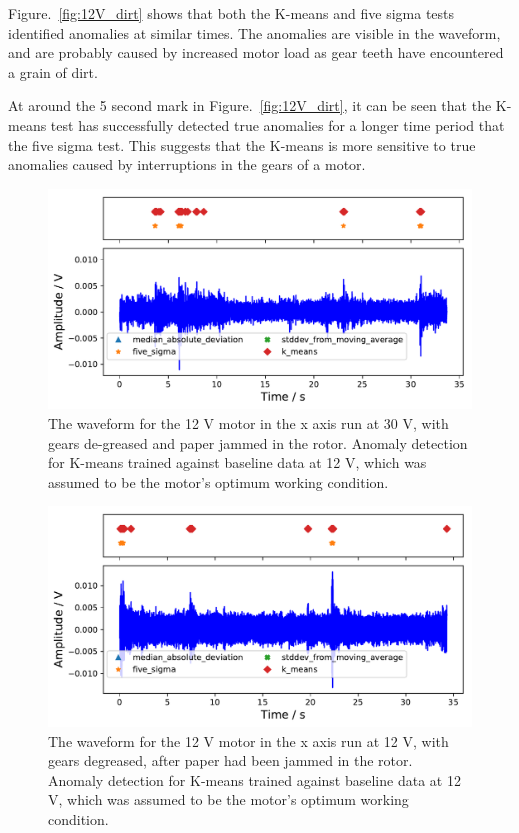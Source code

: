 Figure.~\ref{fig:12V_dirt} shows that both the K-means and five sigma tests identified anomalies at similar times. The anomalies are visible in the waveform, and are probably caused by increased motor load as gear teeth have encountered a grain of dirt. 

At around the 5 second mark in Figure.~\ref{fig:12V_dirt}, it can be seen that the K-means test has successfully detected true anomalies for a longer time period that the five sigma test. This suggests that the K-means is more sensitive to true anomalies caused by interruptions in the gears of a motor.

\begin{figure}[t]
    \includegraphics[width=1.0\textwidth]{fig/WD40_dry_dirt_12V_motornorm12V.pdf}
    \caption[Anomaly Tests 30 V Motor with Paper Jam]{The waveform for the 12 V motor in the x axis run at 30 V, with gears de-greased and paper jammed in the rotor. Anomaly detection for K-means trained against baseline data at 12 V, which was assumed to be the motor's optimum working condition.}
    \label{fig:12V_paper}
\end{figure}

\begin{figure}[t]
    \includegraphics[width=1.0\textwidth]{fig/WD40_after_paper_12V_motornorm12V.pdf}
    \caption[Anomaly Tests 12 V Motor after Paper Jam]{The waveform for the 12 V motor in the x axis run at 12 V, with gears degreased, after paper had been jammed in the rotor. Anomaly detection for K-means trained against baseline data at 12 V, which was assumed to be the motor's optimum working condition.}
    \label{fig:12V_afterpaper}
\end{figure}

